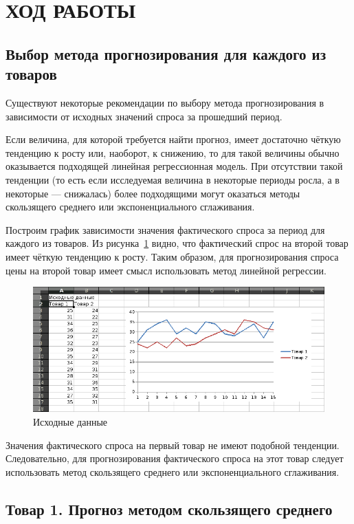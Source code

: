 \section{ХОД РАБОТЫ}

\subsection{Выбор метода прогнозирования для каждого из товаров}

Существуют некоторые рекомендации по выбору метода прогнозирования в
зависимости от исходных значений спроса за прошедший период.

Если величина, для которой требуется найти прогноз, имеет достаточно
чёткую тенденцию к росту или, наоборот, к снижению, то для такой величины
обычно оказывается подходящей линейная регрессионная модель. При отсутствии такой
тенденции (то есть если исследуемая величина в некоторые периоды росла,
а в некоторые --- снижалась) более подходящими могут оказаться методы
скользящего среднего или экспоненциального сглаживания.

Построим график зависимости значения фактического спроса за период
для каждого из товаров. Из рисунка~\ref{fig:initial} видно, что
фактический спрос на второй товар имеет чёткую тенденцию к росту.
Таким образом, для прогнозирования спроса цены на второй товар
имеет смысл использовать метод линейной регрессии.

\begin{figure}[h!]
  \centering
  \includegraphics[width=150mm]{pic/initial}
  \caption{Исходные данные}
  \label{fig:initial}
\end{figure}

Значения фактического спроса на первый товар не имеют подобной тенденции.
Следовательно, для прогнозирования фактического спроса на этот товар следует
использовать метод скользящего среднего или экспоненциального сглаживания.


\subsection{Товар 1. Прогноз методом скользящего среднего}

